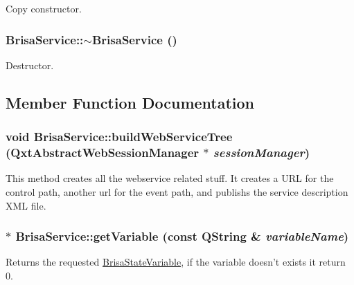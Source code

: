 Copy constructor. \hypertarget{classBrisaUpnp_1_1BrisaService_a46039d40b277bac4b50112d75d5f03c7}{
\subsubsection[{$\sim$BrisaService}]{\setlength{\rightskip}{0pt plus 5cm}BrisaService::$\sim$BrisaService ()}}
\label{classBrisaUpnp_1_1BrisaService_a46039d40b277bac4b50112d75d5f03c7}


Destructor. 

\subsection{Member Function Documentation}
\hypertarget{classBrisaUpnp_1_1BrisaService_ae52e9285fd603cbf7f9e7d2d73d4a8b4}{
\subsubsection[{buildWebServiceTree}]{\setlength{\rightskip}{0pt plus 5cm}void BrisaService::buildWebServiceTree (QxtAbstractWebSessionManager $\ast$ {\em sessionManager})}}
\label{classBrisaUpnp_1_1BrisaService_ae52e9285fd603cbf7f9e7d2d73d4a8b4}


This method creates all the webservice related stuff. It creates a URL for the control path, another url for the event path, and publishs the service description XML file. \hypertarget{classBrisaUpnp_1_1BrisaService_a46f4663b0d7bd8f9b1d22820482afc59}{
\subsubsection[{getVariable}]{ $\ast$ BrisaService::getVariable (const QString \& {\em variableName})}}
\label{classBrisaUpnp_1_1BrisaService_a46f4663b0d7bd8f9b1d22820482afc59}


Returns the requested \hyperlink{classBrisaUpnp_1_1BrisaStateVariable}{BrisaStateVariable}, if the variable doesn't exists it return 0. 

